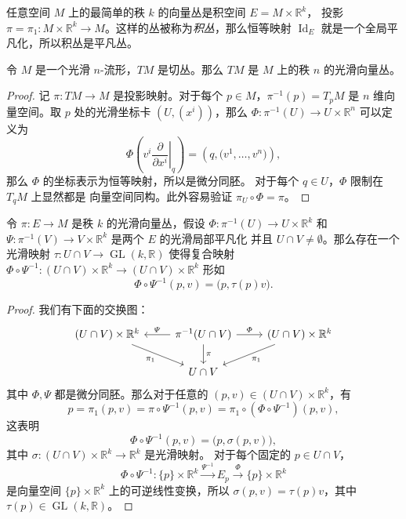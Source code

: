 \documentclass[fontset=none]{Notes}
\DeclareMathOperator\GL{GL}
\DeclareMathOperator\Id{Id}
\begin{document}
\begin{example}[积丛]
  任意空间 $M$ 上的最简单的秩 $k$ 的向量丛是积空间 $E=M\times \mathbb{R}^k$，
  投影 $\pi=\pi_1:M\times \mathbb{R}^k\to M$。这样的丛被称为\emph{积丛}，那么恒等映射
  $\Id_E$ 就是一个全局平凡化，所以积丛是平凡丛。
\end{example}

\begin{proposition}[切丛作为向量丛]
  令 $M$ 是一个光滑 $n$-流形，$TM$ 是切丛。那么
  $TM$ 是 $M$ 上的秩 $n$ 的光滑向量丛。
\end{proposition}
\begin{proof}
  记 $\pi:TM\to M$ 是投影映射。对于每个 $p\in M$，$\pi^{-1}(p)=T_pM$
  是 $n$ 维向量空间。取 $p$ 处的光滑坐标卡 $(U,(x^i))$，那么
  $\varPhi:\pi^{-1}(U)\to U\times \mathbb{R}^n$ 可以定义为
  \[
    \varPhi\left(v^i\left.\frac{\partial}{\partial x^i}\right|_q\right) 
    =\left(q,\bigl(v^1,\dots,v^n\bigr)\right),
  \]
  那么 $\varPhi$ 的坐标表示为恒等映射，所以是微分同胚。
  对于每个 $q\in U$，$\varPhi$ 限制在 $T_qM$ 上显然都是
  向量空间同构。此外容易验证 $\pi_U\circ \varPhi=\pi$。
\end{proof}
 
\begin{lemma}
  令 $\pi:E\to M$ 是秩 $k$ 的光滑向量丛，假设 $\varPhi:\pi^{-1}(U)\to U\times \mathbb{R}^k$
  和 $\varPsi:\pi^{-1}(V)\to V\times \mathbb{R}^k$ 是两个 $E$ 的光滑局部平凡化
  并且 $U\cap V\neq\emptyset$。那么存在一个光滑映射 $\tau:U\cap V\to \GL(k,\mathbb{R})$
  使得复合映射 $\varPhi\circ\varPsi^{-1}:(U\cap V)\times \mathbb{R}^k\to (U\cap V)\times \mathbb{R}^k$
  形如
  \[
    \varPhi\circ\varPsi^{-1}(p,v)=\bigl(p,\tau(p)v\bigr)  .
  \]
\end{lemma}
\begin{proof}
  我们有下面的交换图：
  \[
    \begin{tikzcd}[column sep=2.4em]
      (U\cap V)\times \mathbb{R}^k\arrow[dr,"\pi_1"']
      &
      \pi^{-1}(U\cap V)\arrow[l,"\varPsi"']\arrow[r,"\varPhi"]\arrow[d,"\pi"]
      &
      (U\cap V)\times \mathbb{R}^k\arrow[dl,"\pi_1"]\\
      & 
      U\cap V
      &
    \end{tikzcd}  
  \]
  其中 $\varPhi,\varPsi$ 都是微分同胚。那么对于任意的
  $(p,v)\in(U\cap V)\times \mathbb{R}^k$，有
  \[
    p=\pi_1(p,v)=\pi\circ\varPsi^{-1}(p,v)=\pi_1\circ(\varPhi\circ\varPsi^{-1})
    (p,v),  
  \]
  这表明
  \[
    \varPhi\circ\varPsi^{-1}(p,v)=\bigl(p,\sigma(p,v)\bigr),
  \]
  其中 $\sigma:(U\cap V)\times \mathbb{R}^k\to \mathbb{R}^k$ 是光滑映射。
  对于每个固定的 $p\in U\cap V$，
  \[ 
    \varPhi\circ\varPsi^{-1}:\{p\}\times \mathbb{R}^k\xrightarrow{\varPsi^{-1}}
    E_p\xrightarrow{\varPhi}\{p\}\times \mathbb{R}^k
  \]
  是向量空间 $\{p\}\times \mathbb{R}^k$ 上的可逆线性变换，所以
  $\sigma(p,v)=\tau(p)v$，其中 $\tau(p)\in\GL(k,\mathbb{R})$。
\end{proof}
\end{document}
